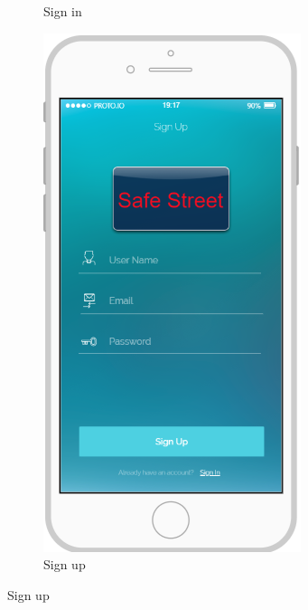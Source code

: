 \documentclass{article}
\begin{document}
\begin{figure}[H]
\begin{subfigure}[H]{0.49\linewidth}
				\caption{Sign in}
			\end{subfigure}	
			\begin{subfigure}[H]{0.49\linewidth}
				\includegraphics[width=\linewidth]{images/Sign_Up.png}
				\caption{Sign up}
			\end{subfigure}
		\end{figure}
\end{document}
